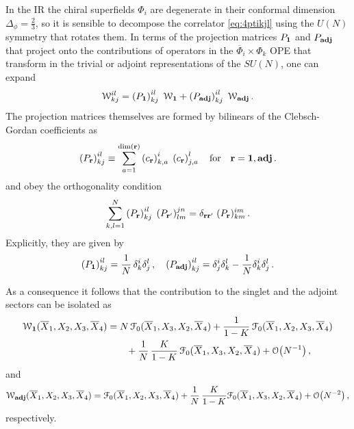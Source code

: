 \documentclass[11pt]{article}
\newcommand{\Xb}{\overline{X}}
\begin{document}
In the IR the chiral superfields $\Phi_i$ are  degenerate in their conformal dimension $\Delta_\phi = \frac{2}{3}$, so it is sensible to decompose the correlator \eqref{eq:4ptikjl} using the $U(N)$ symmetry that rotates them. In terms of the projection matrices $P_{\bf 1}$ and $P_{\bf adj}$ that project onto the contributions of operators in the $\overline{\Phi}_i\times \Phi_k$ OPE that transform in the trivial or adjoint representations of the $SU(N)$, one can expand
%
\begin{equation}\label{eqn:Wikjldecompose}
\mathcal{W}^{il}_{kj}
  = \left(P_\mathbf{1}\right)^{il}_{kj} \;  \mathcal{W}_\mathbf{1} + \left(P_{\bf adj}\right)^{il}_{kj} \; \mathcal{W}_\mathbf{adj} \,.
\end{equation}
%
The projection matrices themselves are formed by bilinears of the Clebsch-Gordan coefficients as
%
\begin{equation}
\left(P_{\bf r}\right)^{il}_{kj} \equiv \sum_{a=1}^{{\rm dim}({\bf r})} \left(c_{\bf r}\right)^i_{k,a}\; 
  \left(c_{{\bf r}}\right)^l_{j,a}\quad{\rm for}\quad{\bf r}={\bf 1},{\bf adj}\,.
\end{equation}
and obey the orthogonality condition
%
\begin{equation}
\sum_{k,l=1}^N \left(P_{\bf r}\right)^{il}_{kj} \; \left(P_{{\bf r}'}\right)^{jn}_{l m} = \delta_{{\bf r}{\bf r}'} \; (P_{\bf r})^{im}_{k m}\,.
\end{equation}
%
Explicitly, they are given by
%
\begin{equation}
\left(P_{\bf 1}\right)^{il}_{kj} = \frac{1}{N}\, \delta^i_{k} \delta^l_{j}\,,\quad \left(P_{\bf adj}\right)^{il}_{kj} = \delta^i_{j} \delta^l_{k} - \frac{1}{N} \delta^i_{k} \delta^l_{j}\,.
\end{equation}
%

As a consequence it follows that the contribution to the singlet and the adjoint sectors can be isolated as 
\begin{equation}\label{eq:Wsinglet}
\begin{split}
\mathcal{W}_{\bf 1}(\Xb_{1},X_{2},X_{3},\Xb_{4})
&=
  N\, \mathcal{F}_0(\Xb_{1},X_{3},X_{2},\Xb_{4})+ \frac{1}{1-K} \, 
    \mathcal{F}_0(\Xb_{1},X_{2},X_{3},\Xb_{4}) \\
& \qquad 
  + \frac{1}{N} \, \frac{K}{1-K}\, \mathcal{F}_0(\Xb_{1},X_{3},X_{2},\Xb_{4})+ \order{N^{-1}}\,, 
\end{split}
\end{equation}
%
and 
%
\begin{equation}\label{eq:Wadj} 
\mathcal{W}_{\bf adj}(\Xb_{1},X_{2},X_{3},\Xb_{4})
=
  \mathcal{F}_0(\Xb_{1},X_{2},X_{3},\Xb_{4}) + \frac{1}{N} \, \frac{K}{1-K}\mathcal{F}_0(\Xb_{1},X_{3},X_{2},\Xb_{4})+ \order{N^{-2}}\,,
\end{equation}
%
respectively. 
\end{document}
